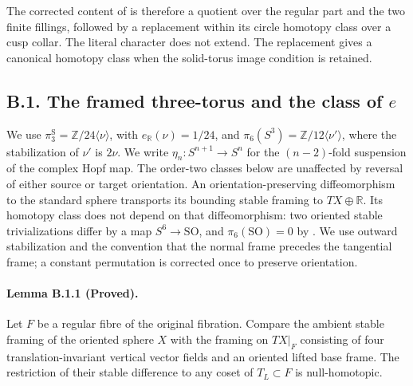 The corrected content of \cite[Remark 8.3]{mapsEngel} is
therefore a quotient over the regular part and the two finite
fillings, followed by a replacement within its circle homotopy
class over a cusp collar.  The literal character does not
extend.  The replacement gives a canonical homotopy class
when the solid-torus image condition is retained.

\subsection{B.1. The framed three-torus and the class of $e$}

We use $\pi_3^{\mathrm S}=\mathbb Z/24\langle\nu\rangle$, with
$e_{\mathbb R}(\nu)=1/24$, and
$\pi_6(S^3)=\mathbb Z/12\langle\nu'\rangle$, where the
stabilization of $\nu'$ is $2\nu$.  We write
$\eta_n:S^{n+1}\to S^n$ for the $(n-2)$-fold suspension of
the complex Hopf map.  The order-two classes below are
unaffected by reversal of either source or target orientation.
An orientation-preserving diffeomorphism to the standard sphere
transports its bounding stable framing to $TX\oplus\mathbb R$.
Its homotopy class does not depend on that diffeomorphism:
two oriented stable trivializations differ by a map
$S^6\to\mathrm{SO}$, and $\pi_6(\mathrm{SO})=0$
by \cite[Corollary to Theorem II and the table on p.~315]{mapsBott59}.
We use outward stabilization and the convention that the normal
frame precedes the tangential frame; a constant permutation is
corrected once to preserve orientation.

\paragraph{Lemma B.1.1 (Proved).}
Let $F$ be a regular fibre of the original fibration.  Compare
the ambient stable framing of the oriented sphere $X$ with
the framing on $TX|_F$ consisting of four translation-invariant
vertical vector fields and an oriented lifted base frame.
The restriction of their stable difference to any coset of
$T_L\subset F$ is null-homotopic.

